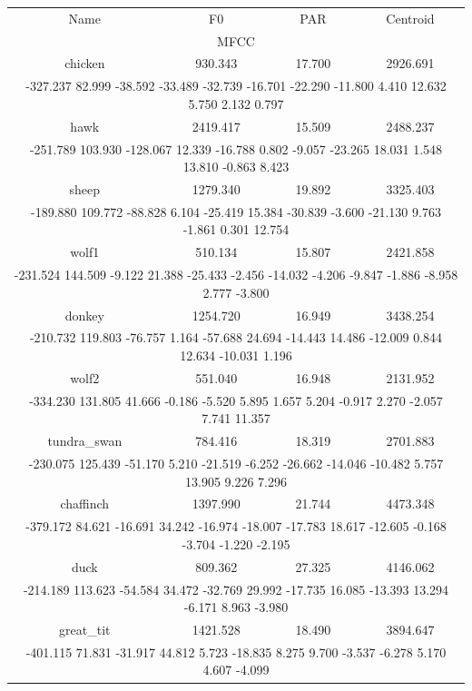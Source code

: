 \documentclass{article}
\begin{document}
\begin{tabular}{|c|c|c|c|}\hline
Name & F0 & PAR & Centroid \\\multicolumn{4}{|c|}{MFCC } \\ \hline
chicken & 930.343 & 17.700 & 2926.691 \\\multicolumn{4}{|c|}{-327.237 82.999 -38.592 -33.489 -32.739 -16.701 -22.290 -11.800 4.410 12.632 5.750 2.132 0.797 } \\ \hline
hawk & 2419.417 & 15.509 & 2488.237 \\\multicolumn{4}{|c|}{-251.789 103.930 -128.067 12.339 -16.788 0.802 -9.057 -23.265 18.031 1.548 13.810 -0.863 8.423 } \\ \hline
sheep & 1279.340 & 19.892 & 3325.403 \\\multicolumn{4}{|c|}{-189.880 109.772 -88.828 6.104 -25.419 15.384 -30.839 -3.600 -21.130 9.763 -1.861 0.301 12.754 } \\ \hline
wolf1 & 510.134 & 15.807 & 2421.858 \\\multicolumn{4}{|c|}{-231.524 144.509 -9.122 21.388 -25.433 -2.456 -14.032 -4.206 -9.847 -1.886 -8.958 2.777 -3.800 } \\ \hline
donkey & 1254.720 & 16.949 & 3438.254 \\\multicolumn{4}{|c|}{-210.732 119.803 -76.757 1.164 -57.688 24.694 -14.443 14.486 -12.009 0.844 12.634 -10.031 1.196 } \\ \hline
wolf2 & 551.040 & 16.948 & 2131.952 \\\multicolumn{4}{|c|}{-334.230 131.805 41.666 -0.186 -5.520 5.895 1.657 5.204 -0.917 2.270 -2.057 7.741 11.357 } \\ \hline
tundra\_swan & 784.416 & 18.319 & 2701.883 \\\multicolumn{4}{|c|}{-230.075 125.439 -51.170 5.210 -21.519 -6.252 -26.662 -14.046 -10.482 5.757 13.905 9.226 7.296 } \\ \hline
chaffinch & 1397.990 & 21.744 & 4473.348 \\\multicolumn{4}{|c|}{-379.172 84.621 -16.691 34.242 -16.974 -18.007 -17.783 18.617 -12.605 -0.168 -3.704 -1.220 -2.195 } \\ \hline
duck & 809.362 & 27.325 & 4146.062 \\\multicolumn{4}{|c|}{-214.189 113.623 -54.584 34.472 -32.769 29.992 -17.735 16.085 -13.393 13.294 -6.171 8.963 -3.980 } \\ \hline
great\_tit & 1421.528 & 18.490 & 3894.647 \\\multicolumn{4}{|c|}{-401.115 71.831 -31.917 44.812 5.723 -18.835 8.275 9.700 -3.537 -6.278 5.170 4.607 -4.099 } \\ \hline

\end{tabular}
\end{document}
